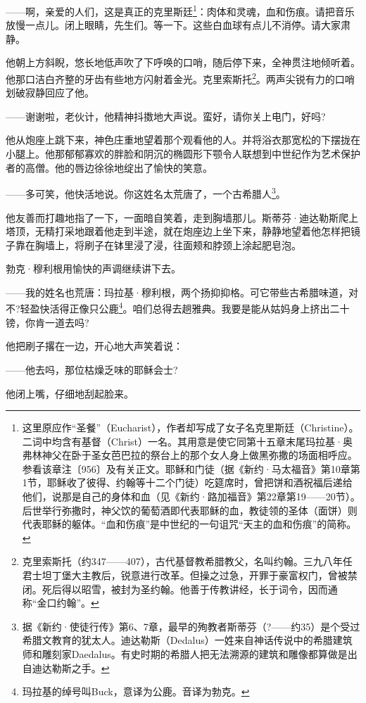 \par ——啊，亲爱的人们，这是真正的克里斯廷\footnote{这里原应作“圣餐”（Eucharist），作者却写成了女子名克里斯廷（Christine）。二词中均含有基督（Christ）一名。其用意是使它同第十五章末尾玛拉基·奥弗林神父在卧于圣女芭巴拉的祭台上的那个女人身上做黑弥撒的场面相呼应。参看该章注〔956〕及有关正文。耶稣和门徒（据《新约·马太福音》第10章第1节，耶稣收了彼得、约翰等十二个门徒）吃筵席时，曾把饼和酒祝福后递给他们，说那是自己的身体和血（见《新约·路加福音》第22章第19——20节）。后世举行弥撒时，神父饮的葡萄酒即代表耶稣的血，教徒领的圣体（面饼）则代表耶稣的躯体。“血和伤痕”是中世纪的一句诅咒“天主的血和伤痕”的简称。}：肉体和灵魂，血和伤痕。请把音乐放慢一点儿。闭上眼睛，先生们。等一下。这些白血球有点儿不消停。请大家肃静。
\par 他朝上方斜睨，悠长地低声吹了下呼唤的口哨，随后停下来，全神贯注地倾听着。他那口洁白齐整的牙齿有些地方闪射着金光。克里索斯托\footnote{克里索斯托（约347——407），古代基督教希腊教父，名叫约翰。三九八年任君士坦丁堡大主教后，锐意进行改革。但操之过急，开罪于豪富权门，曾被禁闭。死后得以昭雪，被封为圣约翰。他善于传教讲经，长于词令，因而通称“金口约翰”。}。两声尖锐有力的口哨划破寂静回应了他。
\par ——谢谢啦，老伙计，他精神抖擞地大声说。蛮好，请你关上电门，好吗?
\par 他从炮座上跳下来，神色庄重地望着那个观看他的人。并将浴衣那宽松的下摆拢在小腿上。他那郁郁寡欢的胖脸和阴沉的椭圆形下颚令人联想到中世纪作为艺术保护者的高僧。他的唇边徐徐地绽出了愉快的笑意。
\par ——多可笑，他快活地说。你这姓名太荒唐了，一个古希腊人\footnote{据《新约·使徒行传》第6、7章，最早的殉教者斯蒂芬（?——约35）是个受过希腊文教育的犹太人。迪达勒斯（Dedalus）一姓来自神话传说中的希腊建筑师和雕刻家Daedalus。有史时期的希腊人把无法溯源的建筑和雕像都算做是出自迪达勒斯之手。}。
\par 他友善而打趣地指了一下，一面暗自笑着，走到胸墙那儿。斯蒂芬·迪达勒斯爬上塔顶，无精打采地跟着他走到半途，就在炮座边上坐下来，静静地望着他怎样把镜子靠在胸墙上，将刷子在钵里浸了浸，往面颊和脖颈上涂起肥皂泡。
\par 勃克·穆利根用愉快的声调继续讲下去。
\par ——我的姓名也荒唐：玛拉基·穆利根，两个扬抑抑格。可它带些古希腊味道，对不?轻盈快活得正像只公鹿\footnote{玛拉基的绰号叫Buck，意译为公鹿。音译为勃克。}。咱们总得去趟雅典。我要是能从姑妈身上挤出二十镑，你肯一道去吗?
\par 他把刷子撂在一边，开心地大声笑着说：
\par ——他去吗，那位枯燥乏味的耶稣会士?
\par 他闭上嘴，仔细地刮起脸来。
